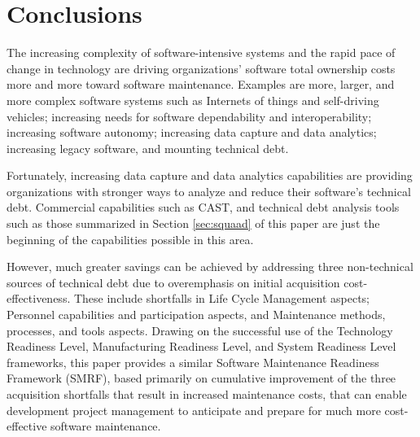 \section{Conclusions}
\label{sec:conclusion}
The increasing complexity of software-intensive systems and the rapid pace of change in technology are driving organizations' software total ownership costs more and more toward software maintenance. Examples are more, larger, and more complex software systems such as Internets of things and self-driving vehicles; increasing needs for software dependability and interoperability; increasing software autonomy; increasing data capture and data analytics; increasing legacy software, and mounting technical debt.

Fortunately, increasing data capture and data analytics capabilities are  providing organizations with stronger ways to analyze and reduce their software's technical debt. Commercial capabilities such as CAST, and technical debt analysis tools such as those summarized in Section \ref{sec:squaad} of this paper are just the beginning of the capabilities possible in this area.

However, much greater savings can be achieved by addressing three non-technical sources of technical debt due to overemphasis  on initial acquisition cost-effectiveness. These include shortfalls  in Life Cycle Management aspects; Personnel capabilities and participation aspects, and Maintenance methods, processes, and tools aspects. Drawing on the successful use of the Technology Readiness Level, Manufacturing Readiness Level, and System Readiness Level frameworks, this paper provides a similar Software Maintenance Readiness Framework (SMRF), based primarily on cumulative improvement of the three acquisition shortfalls that result in increased maintenance costs, that can enable development project management to anticipate and prepare for much more cost-effective software maintenance.